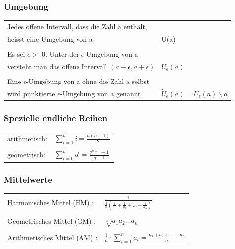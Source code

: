 		\subsubsection{Umgebung}
			\begin{tabular}{ll} 
				Jedes offene Intervall, dass die Zahl a enthält, & \\ 
				heisst eine Umgebung von a                       &  U(a)\\
				\\
				Es sei $\epsilon >$ 0. Unter der $\epsilon$-Umgebung von a & \\ 
				versteht man das offene Intervall $(a-\epsilon,a+\epsilon)$ &  $U_\epsilon(a)$\\ 
				\\
				Eine $\epsilon$-Umgebung von a ohne die Zahl a selbst & \\ 
				wird punktierte $\epsilon$-Umgebung von a genannt & $\dot{U}_\epsilon(a)=U_\epsilon(a)\smallsetminus{a}$ \\ 
			\end{tabular}
			
		\subsubsection{Spezielle endliche Reihen}
			\begin{tabular}{ll} 
				arithmetisch: & $\sum\limits _{i=1}^n i = \frac{n(n+1)}{2}$ \\
				\\
				geometrisch: & $\sum\limits _{i=0}^n q^i = \frac{q^{n+1} - 1}{q - 1}$ \\
			\end{tabular}
				
		\subsubsection{Mittelwerte}
			\begin{tabular}{ll} 
				Harmonisches Mittel (HM) : &  $\frac{1}{\frac{1}{n}(\frac{1}{a_1}+\frac{1}{a_2}+...+\frac{1}{a_n})}$ \\
				\\
				Geometrisches Mittel (GM) : & $\sqrt[n]{a_1 a_2 \ldots a_n}$ \\
				\\
				Arithmetisches Mittel (AM) : & $\frac{1}{n} \cdot \sum\limits _{i=1}^n a_i = 	\frac{a_1+a_2+...+a_n}{n}$ \\
			\end{tabular}
			
